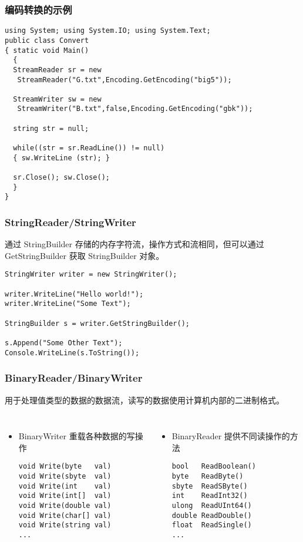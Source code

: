\begin{frame}[fragile]
\frametitle{编码转换的示例}
\begin{lstlisting}
using System; using System.IO; using System.Text;
public class Convert
{ static void Main()
  {
  StreamReader sr = new 
   StreamReader("G.txt",Encoding.GetEncoding("big5"));

  StreamWriter sw = new 
   StreamWriter("B.txt",false,Encoding.GetEncoding("gbk"));

  string str = null;
  
  while((str = sr.ReadLine()) != null)
  { sw.WriteLine (str); }

  sr.Close(); sw.Close();
  }
}
\end{lstlisting}
\end{frame}

\begin{frame}[fragile]
\frametitle{StringReader/StringWriter}
\CJKindent 通过 StringBuilder 存储的内存字符流，操作方式和流相同，但可以通过
GetStringBuilder 获取 StringBuilder 对象。

\begin{lstlisting}
StringWriter writer = new StringWriter();

writer.WriteLine("Hello world!");
writer.WriteLine("Some Text");

StringBuilder s = writer.GetStringBuilder();

s.Append("Some Other Text");
Console.WriteLine(s.ToString());

\end{lstlisting}
\end{frame}


\begin{frame}[fragile]
\frametitle{BinaryReader/BinaryWriter}
\CJKindent 用于处理值类型的数据的数据流，读写的数据使用计算机内部的二进制格式。

\begin{columns}[t]
  \begin{itemize}
  \item BinaryWriter 重载各种数据的写操作
\begin{lstlisting}
void Write(byte   val)
void Write(sbyte  val)
void Write(int    val)
void Write(int[]  val)
void Write(double val)
void Write(char[] val)
void Write(string val)
...
\end{lstlisting}
  \end{itemize}
  \begin{itemize}
  \item BinaryReader 提供不同读操作的方法
\begin{lstlisting}
bool   ReadBoolean()
byte   ReadByte()
sbyte  ReadSByte()
int    ReadInt32()
ulong  ReadUInt64()
double ReadDouble()
float  ReadSingle()
...
\end{lstlisting}
  \end{itemize}
\end{columns}
\end{frame}

